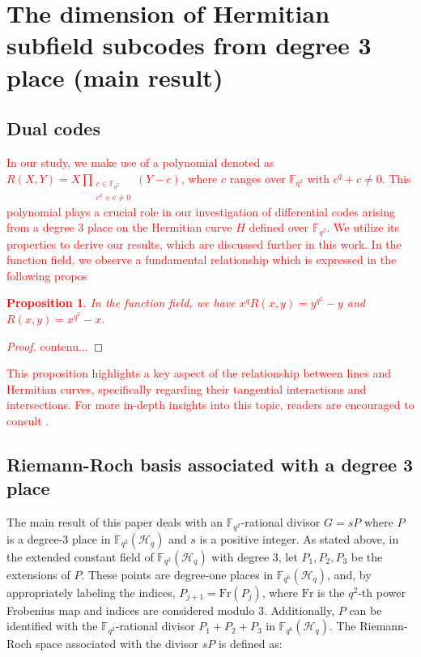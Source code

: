 \documentclass[a4paper]{amsart}
\theoremstyle{plain}
\newtheorem{proposition}[theorem]{Proposition}
\theoremstyle{definition}
\theoremstyle{remark}
\begin{document}
\section{The dimension of Hermitian subfield subcodes from degree 3 place (main result)}

\subsection{Dual codes}

\textcolor{red}{
In our study, we make use of a polynomial denoted as $R(X,Y) = X \prod\limits_{\substack{c \in \mathbb{F}_{q^2} \\ c^q + c \neq 0}} (Y-c)$, where $c$ ranges over $\mathbb{F}_{q^2}$ with $c^q + c \neq 0$. This polynomial plays a crucial role in our investigation of differential codes arising from a degree 3 place on the Hermitian curve $H$ defined over $\mathbb{F}_{q^2}$. We utilize its properties to derive our results, which are discussed further in this work.
In the function field, we observe a fundamental relationship which is expressed in the following propos
\begin{proposition}
	In the function field, we have $x^{q}R(x, y) = y^{q^2} - y$ and $R(x, y) = x^{q^2} - x$.
\end{proposition} 
\begin{proof}
	contenu...
\end{proof}
This proposition highlights a key aspect of the relationship between lines and Hermitian curves, specifically regarding their tangential interactions and intersections. For more in-depth insights into this topic, readers are encouraged to consult \cite[Section~2]{korchmaros2013hermitian}.}


\subsection{Riemann-Roch basis associated with a degree 3 place}
The main result of this paper deals with an $\mathbb{F}_{q^2}$-rational divisor $G=sP$ where $P$ is a degree-3 place in $\mathbb{F}_{q^2}(\mathscr{H}_q)$ and $s$ is a positive integer. As stated above, in the extended constant field of $\mathbb{F}_{q^2}(\mathscr{H}_q)$ with degree $3$, let $P_1, P_2, P_3$ be the extensions of $P$. These points are degree-one places in $\mathbb{F}_{q^6}(\mathscr{H}_q)$, and, by appropriately labeling the indices, $P_{j+1} = \text{Fr}(P_j)$, where $\text{Fr}$ is the $q^2$-th power Frobenius map and indices are considered modulo $3$. Additionally, $P$ can be identified with the $\mathbb{F}_{q^2}$-rational divisor $P_1+P_2+P_3$ in $\mathbb{F}_{q^6}(\mathscr{H}_q)$. The Riemann-Roch space associated with the divisor $sP$ \cite{korchmaros2013hermitian} is defined as:
\end{document}
